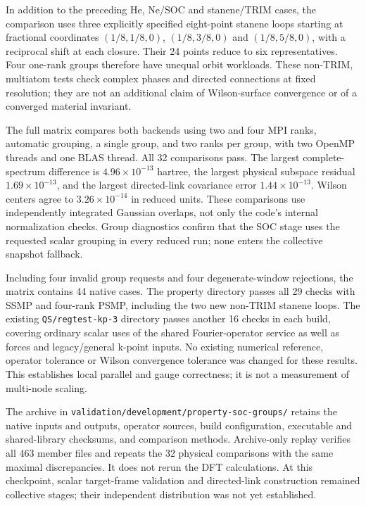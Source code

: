 \documentclass[11pt]{article}
\begin{document}
In addition to the preceding He, Ne/SOC and stanene/TRIM cases,
the comparison uses three explicitly specified eight-point stanene
loops starting at fractional coordinates $(1/8,1/8,0)$,
$(1/8,3/8,0)$ and $(1/8,5/8,0)$, with a reciprocal shift at
each closure. Their 24 points reduce to six representatives.
Four one-rank groups therefore have unequal orbit workloads.
These non-TRIM, multiatom tests check complex phases and directed
connections at fixed resolution; they are not an additional claim
of Wilson-surface convergence or of a converged material invariant.

The full matrix compares both backends using two and four MPI ranks,
automatic grouping, a single group, and two ranks per group, with
two OpenMP threads and one BLAS thread. All 32 comparisons pass.
The largest complete-spectrum difference is
$4.96\times10^{-13}$ hartree, the largest physical subspace
residual $1.69\times10^{-13}$, and the largest directed-link
covariance error $1.44\times10^{-13}$. Wilson centers agree to
$3.26\times10^{-14}$ in reduced units. These comparisons use
independently integrated Gaussian overlaps, not only the code's
internal normalization checks. Group diagnostics confirm that the
SOC stage uses the requested scalar grouping in every reduced run;
none enters the collective snapshot fallback.

Including four invalid group requests and four degenerate-window
rejections, the matrix contains 44 native cases. The property
directory passes all 29 checks with SSMP and four-rank PSMP,
including the two new non-TRIM stanene loops. The existing
\texttt{QS/regtest-kp-3} directory passes another 16 checks in each
build, covering ordinary scalar uses of the shared Fourier-operator
service as well as forces and legacy/general k-point inputs.
No existing numerical
reference, operator tolerance or Wilson convergence tolerance was
changed for these results. This establishes local parallel and
gauge correctness; it is not a measurement of multi-node scaling.

The archive in
\nolinkurl{validation/development/property-soc-groups/}
retains the native inputs and outputs, operator sources, build
configuration, executable and shared-library checksums, and
comparison methods. Archive-only replay verifies all 463 member
files and repeats the 32 physical comparisons with the same
maximal discrepancies. It does not rerun the DFT calculations.
At this checkpoint, scalar target-frame validation and directed-link
construction remained collective stages; their independent
distribution was not yet established.
\end{document}
